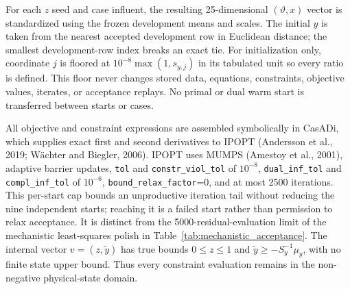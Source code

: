 \documentclass[a4paper,fleqn]{cas-sc}
\begin{document}
For each $z$ seed and case influent, the resulting 25-dimensional $(\vartheta,x)$ vector is standardized using the frozen development means and scales. The initial $y$ is taken from the nearest accepted development row in Euclidean distance; the smallest development-row index breaks an exact tie. For initialization only, coordinate $j$ is floored at $10^{-8}\max(1,s_{y,j})$ in its tabulated unit so every ratio is defined. This floor never changes stored data, equations, constraints, objective values, iterates, or acceptance replays. No primal or dual warm start is transferred between starts or cases.

All objective and constraint expressions are assembled symbolically in CasADi, which supplies exact first and second derivatives to IPOPT (Andersson et al., 2019; W\"achter and Biegler, 2006). IPOPT uses MUMPS (Amestoy et al., 2001), adaptive barrier updates, \texttt{tol} and \texttt{constr\_viol\_tol} of $10^{-8}$, \texttt{dual\_inf\_tol} and \texttt{compl\_inf\_tol} of $10^{-6}$, \texttt{bound\_relax\_factor}=0, and at most 2500 iterations. This per-start cap bounds an unproductive iteration tail without reducing the nine independent starts; reaching it is a failed start rather than permission to relax acceptance. It is distinct from the 5000-residual-evaluation limit of the mechanistic least-squares polish in Table~\ref{tab:mechanistic_acceptance}. The internal vector $v=(z,\widetilde y)$ has true bounds $0\leq z\leq1$ and $\widetilde y\geq-S_y^{-1}\mu_y$, with no finite state upper bound. Thus every constraint evaluation remains in the non-negative physical-state domain.
\end{document}
